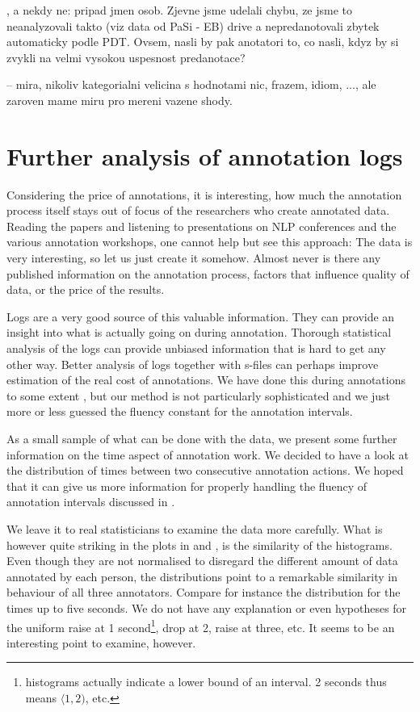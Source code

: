 , a nekdy ne: pripad jmen osob. Zjevne jsme udelali chybu, ze jsme to neanalyzovali takto (viz data od PaSi - EB) drive a nepredanotovali zbytek automaticky podle PDT. Ovsem, nasli by pak anotatori to, co nasli, kdyz by si zvykli na velmi vysokou uspesnost predanotace?

 -- mira, nikoliv kategorialni velicina s hodnotami nic, frazem, idiom, ..., ale zaroven mame miru pro mereni vazene shody. 

\section{Further analysis of annotation logs}
\label{sec:conc:logs}
Considering the price of annotations, it is interesting, how much the annotation process itself stays out of focus of the researchers who create annotated data. Reading the papers and listening to presentations on NLP conferences and the various annotation workshops, one cannot help but see this approach: The data is very interesting, so let us just create it somehow. Almost never is there any published information on the annotation process, factors that influence quality of data, or the price of the results. 

Logs are a  very good source of this valuable information. They can provide an insight into what is actually going on during annotation. Thorough statistical analysis of the logs can provide unbiased information that is hard to get any other way. Better analysis of logs together with s-files can perhaps improve estimation of the real cost of annotations. We have done this during annotations to some extent , but our method is not particularly sophisticated and we just more or less guessed the fluency constant for the annotation intervals.
 
As a small sample of what can be done with the data, we present some further information on the time aspect of annotation work. We decided to have a look at the distribution of times between two consecutive annotation actions. We hoped that it can give us more information for properly handling the fluency of annotation intervals discussed in . 

We leave it to real statisticians to examine the data more carefully. What is however quite striking in the plots in  and , is the similarity of the histograms. Even though they are not normalised to disregard the different amount of data annotated by each person, the distributions point to a remarkable similarity in behaviour of all three annotators. Compare for instance the distribution for the times up to five seconds. We do not have any explanation or even hypotheses for the uniform raise at 1 second\footnote{histograms actually indicate a lower bound of an interval. 2 seconds thus means $\langle1, 2)$, etc.}, drop at 2, raise at three, etc. It seems to be an interesting point to examine, however.

